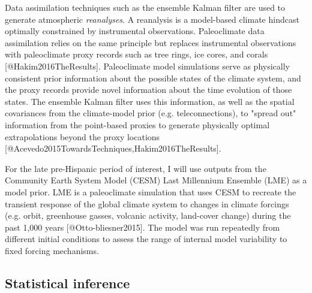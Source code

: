 \documentclass[fleqn,10pt]{wlscirep}
\begin{document}
Data assimilation techniques such as the ensemble Kalman filter are used to generate atmospheric \textit{reanalyses}. A reanalysis is a model-based climate hindcast optimally constrained by instrumental observations. Paleoclimate data assimilation relies on the same principle but replaces instrumental observations with paleoclimate proxy records such as tree rings, ice cores, and corals [@Hakim2016TheResults]. Paleoclimate model simulations serve as physically consistent prior information about the possible states of the climate system, and the proxy records provide novel information about the time evolution of those states. The ensemble Kalman filter uses this information, as well as the spatial covariances from the climate-model prior (e.g. teleconnections), to "spread out" information from the point-based proxies to generate physically optimal extrapolations beyond the proxy locations [@Acevedo2015TowardsTechniques,Hakim2016TheResults].

For the late pre-Hispanic period of interest, I will use outputs from the Community Earth System Model (CESM) Last Millennium Ensemble (LME) as a model prior. LME is a paleoclimate simulation that uses CESM to recreate the transient response of the global climate system to changes in climate forcings (e.g. orbit, greenhouse gasses, volcanic activity, land-cover change) during the past 1,000 years [@Otto-bliesner2015]. The model was run repeatedly from different initial conditions to assess the range of internal model variability to fixed forcing mechanisms.

\subsection*{Statistical inference}
\end{document}
